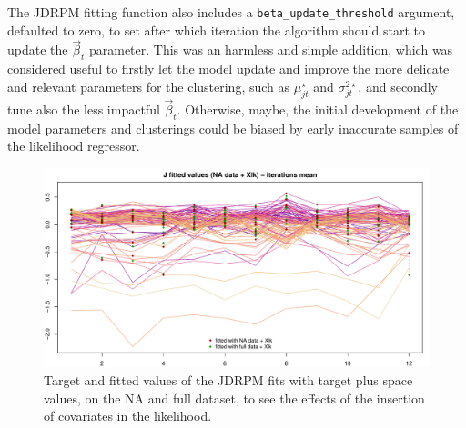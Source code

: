 \documentclass[12pt,	%
	a4paper,		%
	twoside,		%
	openright,		%
	titlepage,%
	]{book}
\theoremstyle{definition}
\newcommand{\mjline}[1]{\texttt{#1}}
\begin{document}
The JDRPM fitting function also includes a \mjline{beta_update_threshold} argument, defaulted to zero, to set after which iteration the algorithm should start to update the $\vec{\beta}_t$ parameter. This was an harmless and simple addition, which was considered useful to firstly let the model update and improve the more delicate and relevant parameters for the clustering, such as $\mu^\star_{jt}$ and $\sigma^{2\star}_{jt}$, and secondly tune also the less impactful $\vec{\beta}_t$. Otherwise, maybe, the initial development of the model parameters and clusterings could be biased by early inaccurate samples of the likelihood regressor.  


\begin{figure}[!ht]
    \centering
    \includegraphics[width=1\linewidth]{Testing/Covariates/NA lk improvement/J_mean_prediction_NA.pdf}
    \caption[Target and fitted values of JDRPM fits, target plus space values, NA dataset, with covariates in the likelihood]{Target and fitted values of the JDRPM fits with target plus space values, on the NA and full dataset, to see the effects of the insertion of covariates in the likelihood.}
    \label{fig: all NA fitted values tests}
\end{figure}
\end{document}
